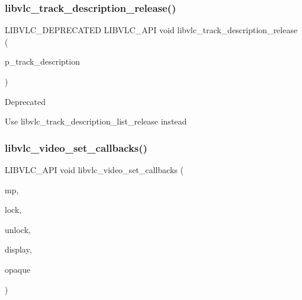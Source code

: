 \subsubsection{\texorpdfstring{libvlc\+\_\+track\+\_\+description\+\_\+release()}{libvlc\_track\_description\_release()}}
{\footnotesize\ttfamily L\+I\+B\+V\+L\+C\+\_\+\+D\+E\+P\+R\+E\+C\+A\+T\+ED L\+I\+B\+V\+L\+C\+\_\+\+A\+PI void libvlc\+\_\+track\+\_\+description\+\_\+release (\begin{DoxyParamCaption}\item[{\hyperlink{structlibvlc__track__description__t}{libvlc\+\_\+track\+\_\+description\+\_\+t} $\ast$}]{p\+\_\+track\+\_\+description }\end{DoxyParamCaption})}

\begin{DoxyRefDesc}{Deprecated}
\item[\hyperlink{deprecated__deprecated000055}{Deprecated}]Use libvlc\+\_\+track\+\_\+description\+\_\+list\+\_\+release instead \end{DoxyRefDesc}
\mbox{\label{group__libvlc__media__player_ga612605f2e5c638d9f4ed59021d714bf0}} 
\subsubsection{\texorpdfstring{libvlc\+\_\+video\+\_\+set\+\_\+callbacks()}{libvlc\_video\_set\_callbacks()}}
{\footnotesize\ttfamily L\+I\+B\+V\+L\+C\+\_\+\+A\+PI void libvlc\+\_\+video\+\_\+set\+\_\+callbacks (\begin{DoxyParamCaption}\item[{libvlc\+\_\+media\+\_\+player\+\_\+t $\ast$}]{mp,  }\item[{\hyperlink{group__libvlc__media__player_ga193de3e82f6de3f9d8f5ccd8b5f2aa98}{libvlc\+\_\+video\+\_\+lock\+\_\+cb}}]{lock,  }\item[{\hyperlink{group__libvlc__media__player_ga024c0f0bba9d3b32a881c40f3cb479bb}{libvlc\+\_\+video\+\_\+unlock\+\_\+cb}}]{unlock,  }\item[{\hyperlink{group__libvlc__media__player_ga2189c9deefc2154ddc5d5f1871b0a106}{libvlc\+\_\+video\+\_\+display\+\_\+cb}}]{display,  }\item[{void $\ast$}]{opaque }\end{DoxyParamCaption})}

